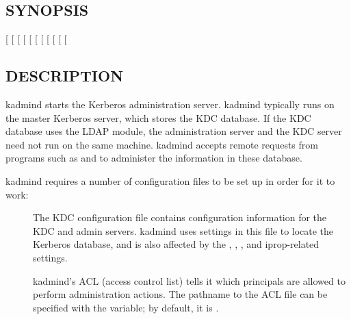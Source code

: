 \documentclass[letterpaper,10pt,english]{sphinxmanual}
\begin{document}
\subsection{SYNOPSIS}
\label{\detokenize{admin/admin_commands/kadmind:synopsis}}
{[} \sphinxstyleemphasis{db\_args}{]}
{[} \sphinxstyleemphasis{realm}{]}
{[}\sphinxstylestrong{-m}{]}
{[}\sphinxstylestrong{-nofork}{]}
{[}\sphinxstylestrong{-proponly}{]}
{[} \sphinxstyleemphasis{port-number}{]}
{[} \sphinxstyleemphasis{pid\_file}{]}
{[} \sphinxstyleemphasis{kdb5\_util\_path}{]}
{[} \sphinxstyleemphasis{kprop\_path}{]}
{[} \sphinxstyleemphasis{kprop\_port}{]}
{[} \sphinxstyleemphasis{dump\_file}{]}


\subsection{DESCRIPTION}
\label{\detokenize{admin/admin_commands/kadmind:description}}
kadmind starts the Kerberos administration server.  kadmind typically
runs on the master Kerberos server, which stores the KDC database.  If
the KDC database uses the LDAP module, the administration server and
the KDC server need not run on the same machine.  kadmind accepts
remote requests from programs such as {\hyperref[\detokenize{admin/admin_commands/kadmin_local:kadmin-1}]{}} and
 to administer the information in these database.

kadmind requires a number of configuration files to be set up in order
for it to work:
\begin{description}
\item[{{\hyperref[\detokenize{admin/conf_files/kdc_conf:kdc-conf-5}]{}}}] \leavevmode
The KDC configuration file contains configuration information for
the KDC and admin servers.  kadmind uses settings in this file to
locate the Kerberos database, and is also affected by the
, , , and iprop-related
settings.

\item[{{\hyperref[\detokenize{admin/conf_files/kadm5_acl:kadm5-acl-5}]{}}}] \leavevmode
kadmind’s ACL (access control list) tells it which principals are
allowed to perform administration actions.  The pathname to the
ACL file can be specified with the  {\hyperref[\detokenize{admin/conf_files/kdc_conf:kdc-conf-5}]{}}
variable; by default, it is {\hyperref[\detokenize{mitK5defaults:paths}]{}}.

\end{description}
\end{document}
